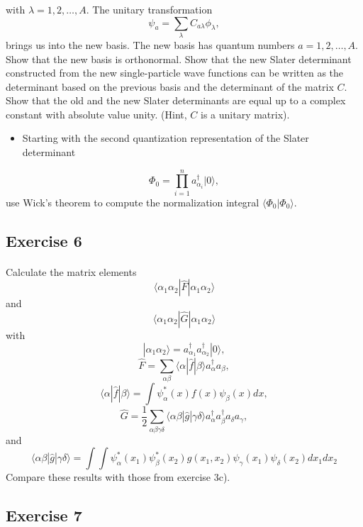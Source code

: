 \documentclass[%
twoside,                 %
final,                   %
10pt]{article}
\begin{document}
\noindent
with $\lambda = 1,2,\dots,A$. The unitary transformation
\[
\psi_a  = \sum_{\lambda} C_{a\lambda}\phi_{\lambda},
\]
brings us into the new basis.  
The new basis has quantum numbers $a=1,2,\dots,A$.
Show that the new basis is orthonormal.
Show that the new Slater determinant constructed from the new single-particle wave functions can be
written as the determinant based on the previous basis and the determinant of the matrix $C$.
Show that the old and the new Slater determinants are equal up to a complex constant with absolute value unity.
(Hint, $C$ is a unitary matrix). 
\begin{itemize}
\item Starting with the second quantization representation of the Slater determinant 
\end{itemize}

\noindent
\[
\Phi_{0}=\prod_{i=1}^{n}a_{\alpha_{i}}^{\dagger}|0\rangle,
\]
use Wick's theorem to compute the normalization integral
$\langle\Phi_{0}|\Phi_{0}\rangle$.



\subsection*{Exercise 6}

\paragraph{}
Calculate the matrix elements
\[
\langle \alpha_{1}\alpha_{2}|\hat{F}|\alpha_{1}\alpha_{2}\rangle
\]
and
\[
\langle \alpha_{1}\alpha_{2}|\hat{G}|\alpha_{1}\alpha_{2}\rangle
\]
with
\[
|\alpha_{1}\alpha_{2}\rangle=a_{\alpha_{1}}^{\dagger}a_{\alpha_{2}}^{\dagger}|0\rangle ,
\]
\[
\hat{F}=\sum_{\alpha\beta}\langle \alpha|\hat{f}|\beta\rangle
a_{\alpha}^{\dagger}a_{\beta}  ,
\]
\[
\langle \alpha|\hat{f}|\beta\rangle=\int \psi_{\alpha}^{*}(x)f(x)\psi_{\beta}(x)dx ,
\]
\[
\hat{G} = \frac{1}{2}\sum_{\alpha\beta\gamma\delta}
\langle \alpha\beta |\hat{g}|\gamma\delta\rangle
a_{\alpha}^{\dagger}a_{\beta}^{\dagger}a_{\delta}a_{\gamma} ,
\]
and
\[
\langle \alpha\beta |\hat{g}|\gamma\delta\rangle=
\int\int \psi_{\alpha}^{*}(x_{1})\psi_{\beta}^{*}(x_{2})g(x_{1},
x_{2})\psi_{\gamma}(x_{1})\psi_{\delta}(x_{2})dx_{1}dx_{2}
\]
Compare these results with those from exercise 3c).



\subsection*{Exercise 7}
\end{document}
